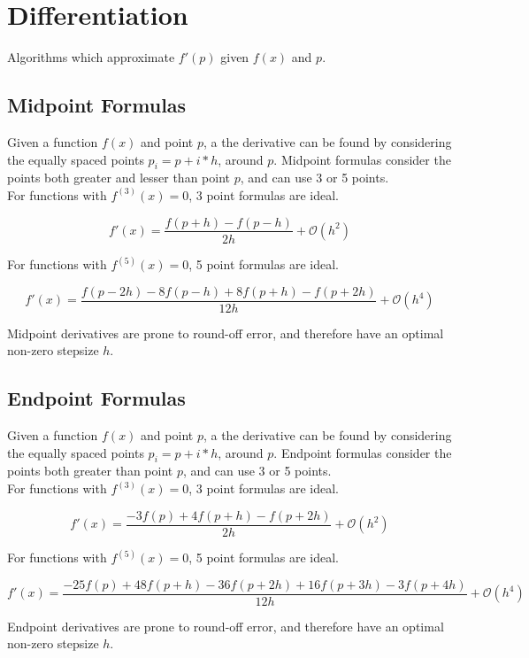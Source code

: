\documentclass[10pt]{article}
\numberwithin{equation}{subsection}
\begin{document}
    \section{Differentiation}

        Algorithms which approximate $f'(p)$ given $f(x)$ and $p$.

        \subsection{Midpoint Formulas}

            Given a function $f(x)$ and point $p$, a the derivative can
            be found by considering the equally spaced points $p_i = p + i*h$,
            around $p$. Midpoint formulas consider the points both greater
            and lesser than point $p$, and can use 3 or 5 points.\\

            For functions with $f^{(3)}(x) = 0$, 3 point formulas are ideal.

            $$
                f'(x) = \frac{f(p + h) - f(p - h)}{2h} + \mathcal{O}(h^2)
            $$

            For functions with $f^{(5)}(x) = 0$, 5 point formulas are ideal.

            $$
                f'(x) = \frac{f(p-2h)-8f(p-h)+8f(p+h)-f(p+2h)}{12h} + \mathcal{O}(h^4)
            $$

            Midpoint derivatives are prone to round-off error, and therefore
            have an optimal non-zero stepsize $h$.

            

        \subsection{Endpoint Formulas}

            Given a function $f(x)$ and point $p$, a the derivative can
            be found by considering the equally spaced points $p_i = p + i*h$,
            around $p$. Endpoint formulas consider the points both greater
            than point $p$, and can use 3 or 5 points.\\

            For functions with $f^{(3)}(x) = 0$, 3 point formulas are ideal.

            $$
                f'(x) = \frac{-3f(p)+4f(p+h)-f(p+2h)}{2h} + \mathcal{O}(h^2)
            $$

            For functions with $f^{(5)}(x) = 0$, 5 point formulas are ideal.

            $$
                f'(x) = \frac{-25f(p)+48f(p+h)-36f(p+2h)+16f(p+3h)-3f(p+4h)}{12h} + \mathcal{O}(h^4)
            $$

            Endpoint derivatives are prone to round-off error, and therefore
            have an optimal non-zero stepsize $h$.
\end{document}
